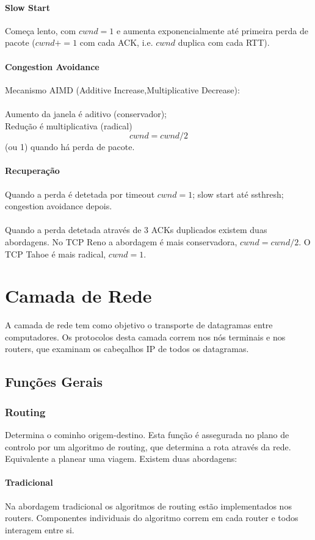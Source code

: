 \documentclass[10pt,a4paper]{report}
\begin{document}
\subsubsection{Slow Start}
Começa lento, com $cwnd = 1$ e aumenta exponencialmente até primeira perda de pacote ($cwnd += 1$ com cada ACK, i.e. $cwnd$ duplica com cada RTT).
\subsubsection{Congestion Avoidance}
Mecanismo AIMD (Additive Increase,Multiplicative Decrease):\\
\\
Aumento da janela é aditivo (conservador);\\
Redução é multiplicativa (radical)\\
$$
cwnd = cwnd/2
$$
(ou 1) quando há perda de pacote.
\subsubsection{Recuperação}
Quando a perda é detetada por timeout $cwnd = 1$; slow start até ssthresh; congestion avoidance depois.\\
\\
Quando a perda detetada através de 3 ACKs duplicados existem duas abordagens. No TCP Reno a abordagem é mais conservadora, $cwnd = cwnd/2$. O TCP Tahoe é mais radical, $cwnd = 1$.

\chapter{Camada de Rede}
A camada de rede tem como objetivo o transporte de datagramas entre computadores.
Os protocolos desta camada correm nos nós terminais e nos routers, que examinam os cabeçalhos IP de todos os datagramas.
\minitoc
\section{Funções Gerais}
\subsection{Routing}
Determina o cominho origem-destino. Esta função é assegurada no plano de controlo por um algoritmo de routing, que determina a rota através da rede. Equivalente a planear uma viagem. 
Existem duas abordagens:
\subsubsection{Tradicional}
Na abordagem tradicional os algoritmos de routing estão implementados nos routers. Componentes individuais do algoritmo correm em cada router e todos interagem entre si.
\end{document}

